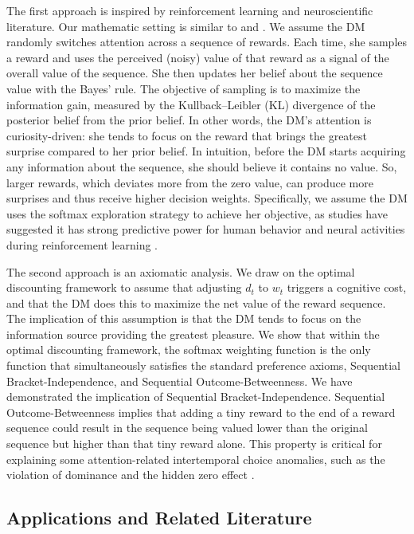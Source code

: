 \documentclass[
  12pt,
]{article}
\begin{document}
The first approach is inspired by reinforcement learning and
neuroscientific literature. Our mathematic setting is similar to
\citet{itti2009bayesian} and \citet{gottlieb2013information}. We assume
the DM randomly switches attention across a sequence of rewards. Each
time, she samples a reward and uses the perceived (noisy) value of that
reward as a signal of the overall value of the sequence. She then
updates her belief about the sequence value with the Bayes' rule. The
objective of sampling is to maximize the information gain, measured by
the Kullback--Leibler (KL) divergence of the posterior belief from the
prior belief. In other words, the DM's attention is curiosity-driven:
she tends to focus on the reward that brings the greatest surprise
compared to her prior belief. In intuition, before the DM starts
acquiring any information about the sequence, she should believe it
contains no value. So, larger rewards, which deviates more from the zero
value, can produce more surprises and thus receive higher decision
weights. Specifically, we assume the DM uses the softmax exploration
strategy to achieve her objective, as studies have suggested it has
strong predictive power for human behavior and neural activities during
reinforcement learning \citep{daw2006cortical, collins2014opponent} .

The second approach is an axiomatic analysis. We draw on the optimal
discounting framework \citep{noor2022optimal,noor2024constrained} to
assume that adjusting \(d_t\) to \(w_t\) triggers a cognitive cost, and
that the DM does this to maximize the net value of the reward sequence.
The implication of this assumption is that the DM tends to focus on the
information source providing the greatest pleasure. We show that within
the optimal discounting framework, the softmax weighting function is the
only function that simultaneously satisfies the standard preference
axioms, Sequential Bracket-Independence, and Sequential
Outcome-Betweenness. We have demonstrated the implication of Sequential
Bracket-Independence. Sequential Outcome-Betweenness implies that adding
a tiny reward to the end of a reward sequence could result in the
sequence being valued lower than the original sequence but higher than
that tiny reward alone. This property is critical for explaining some
attention-related intertemporal choice anomalies, such as the violation
of dominance \citep{scholten2014better, jiang2017better} and the hidden
zero effect
\citep{magen2008hidden, radu2011mechanism, read2017value, dang2021beauty}.

\hypertarget{applications-and-related-literature}{%
\subsection{Applications and Related
Literature}\label{applications-and-related-literature}}
\end{document}
